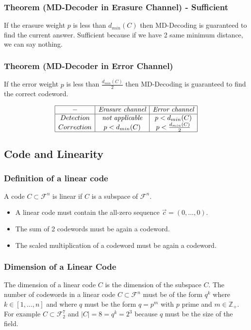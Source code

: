 \documentclass{article}
\begin{document}
\subsubsection{Theorem (MD-Decoder in Erasure Channel) - Sufficient}
If the erasure weight $ p $ is less than $ d_{min}(C) $ then MD-Decoding is guaranteed to find the current answer. Sufficient because if we have 2 same minimum distance, we can say nothing.

\subsubsection{Theorem (MD-Decoder in Error Channel)}
If the error weight $ p $ is less than $ \frac{d_{min}(C)}{2} $ then MD-Decoding is guaranteed to find the correct codeword.

\renewcommand{\arraystretch}{1.5} %
\begin{center} %
\[ %
\begin{array}{|c|c|c|} \hline %
- & \textit{Erasure channel} & \textit{Error channel}\\ \hline
Detection & \textit{ not applicable } & p < d_{min}(C)\\
Correction & p < d_{min}(C) & p < \frac{d_{min}(C)}{2}\\
\hline
\end{array} %
\] %
\end{center}

\subsection{Code and Linearity}
\subsubsection{Definition of a linear code}
A code $ C \subset \mathcal{F}^n $ is linear if $ C $ is a subspace of $ \mathcal{F}^n $.
\begin{itemize}
\item A linear code must contain the all-zero sequence $ \vec{c} = (0,...,0) $.
\item The sum of 2 codewords must be again a codeword.
\item The scaled multiplication of a codeword must be again a codeword.
\end{itemize}

\subsubsection{Dimension of a Linear Code}
\begin{tcolorbox}[sharp corners, colback=green!30, colframe=green!80!blue, title=Dimension of a Linear Code]
The dimension of a linear code $ C $ is the dimension of the subspace $ C $. The number of codewords in a linear code $ C \subset \mathcal{F}^n $ must be of the form $ q^k $ where $ k \in [1,...,n] $ and where $ q $ must be the form $ q = p^m $ with $ p $ prime and $ m \in \mathbb{Z_+} $.
For example $ C \subset \mathcal{F}_{2}^{7} $ and $ |C| = 8 = q^k = 2^3 $ because $ q $ must be the size of the field.
\end{tcolorbox}
\end{document}
